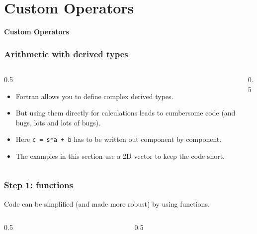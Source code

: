 \section{Custom Operators}

\begin{frame}
	\centering
	\Huge \textbf{Custom Operators}
\end{frame}

\begin{frame}[fragile]
  \frametitle{Arithmetic with derived types}
  \begin{columns}[T]
    \begin{column}{0.5\textwidth}
      \begin{itemize}
        \item Fortran allows you to define complex derived types.
        \item But using them directly for calculations leads to cumbersome code (and bugs, lots and lots of bugs).
        \item Here \texttt{c = s*a + b} has to be written out component by component.
        \item The examples in this section use a 2D vector to keep the code short.
      \end{itemize}
    \end{column}

    \begin{column}{0.5\textwidth}
    
    
    \end{column}
  \end{columns}
\end{frame}

\begin{frame}[fragile]
  \frametitle{Step 1: functions}
   Code can be simplified (and made more robust) by using functions.
  \begin{columns}[T]
    \begin{column}{0.5\textwidth}
          
    \end{column}

    \begin{column}{0.5\textwidth}
    
    \end{column}
  \end{columns}
\end{frame}

